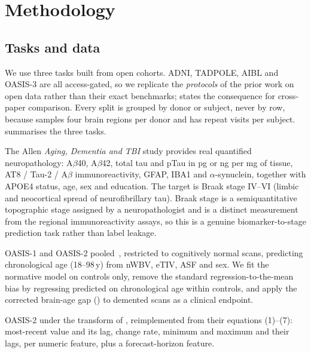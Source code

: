 \section{Methodology}
\label{sec:method}

\subsection{Tasks and data}
\label{sec:method:data}

We use three tasks built from open cohorts. ADNI, TADPOLE, AIBL and OASIS-3 are all access-gated,
so we replicate the \emph{protocols} of the prior work on open data rather than their exact
benchmarks;  states the consequence for cross-paper comparison. Every split
is grouped by donor or subject, never by row, because \act samples four brain regions per donor and
\oasis has repeat visits per subject.  summarises the three tasks.



 The Allen \emph{Aging, Dementia and TBI} study provides real quantified
neuropathology: A$\beta$40, A$\beta$42, total tau and pTau in pg or ng per mg of tissue, AT8 /
Tau-2 / A$\beta$ immunoreactivity, GFAP, IBA1 and $\alpha$-synuclein, together with APOE4 status,
age, sex and education. The target is Braak stage IV--VI (\ie limbic and neocortical spread of
neurofibrillary tau). Braak stage is a semiquantitative topographic stage assigned by a
neuropathologist and is a distinct measurement from the regional immunoreactivity assays, so this
is a genuine biomarker-to-stage prediction task rather than label leakage.

 OASIS-1 and OASIS-2 pooled~\citep{marcus2007oasis}, restricted to cognitively
normal scans, predicting chronological age (18--98\,y) from nWBV, eTIV, ASF and sex. We fit the
normative model on controls only, remove the standard regression-to-the-mean bias by regressing
predicted on chronological age within controls, and apply the corrected brain-age gap (\bag) to
demented scans as a clinical endpoint.

 OASIS-2 under the \ltoc transform of \citet{ding2025l2ctabpfn}, reimplemented
from their equations (1)--(7): most-recent value and its lag, change rate, minimum and maximum and
their lags, per numeric feature, plus a forecast-horizon feature.

